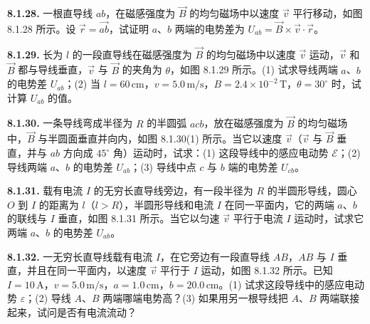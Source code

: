 \textbf{8.1.28.} 一根直导线 $ab$，在磁感强度为 $\vec{B}$ 的均匀磁场中以速度 $\vec{v}$ 平行移动，如图 8.1.28 所示。设 $\vec{r} = \overrightarrow{ab}$，试证明 $a$、$b$ 两端的电势差为 $U_{ab} = \vec{B} \times \vec{v} \cdot \vec{r}$。

\begin{center}
\end{center}

\vfill
\newpage

\textbf{8.1.29.} 长为 $l$ 的一段直导线在磁感强度为 $\vec{B}$ 的均匀磁场中以速度 $\vec{v}$ 运动，$\vec{v}$ 和 $\vec{B}$ 都与导线垂直，$\vec{v}$ 与 $\vec{B}$ 的夹角为 $\theta$，如图 8.1.29 所示。(1) 试求导线两端 $a$、$b$ 的电势差 $U_{ab}$；(2) 当 $l = 60\,\mathrm{cm}$，$v = 5.0\,\mathrm{m/s}$，$B = 2.4 \times 10^{-2}\,\mathrm{T}$，$\theta = 30^{\circ}$ 时，试计算 $U_{ab}$ 的值。

\begin{center}
\end{center}

\vfill
\newpage

\textbf{8.1.30.} 一条导线弯成半径为 $R$ 的半圆弧 $acb$，放在磁感强度为 $\vec{B}$ 的均匀磁场中，$\vec{B}$ 与半圆面垂直并向内，如图 8.1.30(1) 所示。当它以速度 $\vec{v}$（$\vec{v}$ 与 $\vec{B}$ 垂直，并与 $ab$ 方向成 $45^{\circ}$ 角）运动时，试求：(1) 这段导线中的感应电动势 $\mathcal{E}$；(2) 导线两端 $a$、$b$ 的电势差 $U_{ab}$；(3) 导线中点 $c$ 与 $b$ 端的电势差 $U_{cb}$。

\begin{center}
\end{center}

\vfill
\newpage

\textbf{8.1.31.} 载有电流 $I$ 的无穷长直导线旁边，有一段半径为 $R$ 的半圆形导线，圆心 $O$ 到 $I$ 的距离为 $l$（$l > R$），半圆形导线和电流 $I$ 在同一平面内，它的两端 $a$、$b$ 的联线与 $I$ 垂直，如图 8.1.31 所示。当它以匀速 $\vec{v}$ 平行于电流 $I$ 运动时，试求它两端 $a$、$b$ 的电势差 $U_{ab}$。

\begin{center}
\end{center}

\vfill
\newpage

\textbf{8.1.32.} 一无穷长直导线载有电流 $I$，在它旁边有一段直导线 $AB$，$AB$ 与 $I$ 垂直，并且在同一平面内，以速度 $\vec{v}$ 平行于 $I$ 运动，如图 8.1.32 所示。已知 $I = 10\,\mathrm{A}$，$v = 5.0\,\mathrm{m/s}$，$a = 1.0\,\mathrm{cm}$，$b = 20.0\,\mathrm{cm}$。(1) 试求这段导线中的感应电动势 $\varepsilon$；(2) 导线 $A$、$B$ 两端哪端电势高？(3) 如果用另一根导线把 $A$、$B$ 两端联接起来，试问是否有电流流动？

